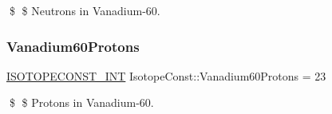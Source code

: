 \$ \$ Neutrons in Vanadium-\/60. \mbox{\label{group___isotope_const-_vanadium-_v60_gaf04b48f5d783cfea1de9f5006dd292c0}} 
\subsubsection{\texorpdfstring{Vanadium60\+Protons}{Vanadium60Protons}}
{\footnotesize\ttfamily \mbox{\hyperlink{group___isotope_const-_macros_ga5f18360b3e99483a35c32d789e62621c}{I\+S\+O\+T\+O\+P\+E\+C\+O\+N\+S\+T\+\_\+\+I\+NT}} Isotope\+Const\+::\+Vanadium60\+Protons = 23}

\$ \$ Protons in Vanadium-\/60. 